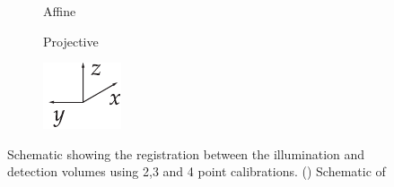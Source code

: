 \begin{figure}
\begin{subfigure}[t]{0.2\textwidth}
        \caption{Affine}\label{fig:geometry/affine}
    \end{subfigure}\hfill
    \begin{subfigure}[t]{0.2\textwidth}
        \centering
        \caption{Projective}\label{fig:geometry/projective}
    \end{subfigure}
    \begin{subfigure}[t]{0.1\textwidth}
        \centering
        \includegraphics{geometry/coordinates}
    \end{subfigure}
    \caption[Schematic showing the registration between the illumination and detection volumes using 2,3 and 4 point calibrations]{
    Schematic showing the registration between the illumination and detection volumes using 2,3 and 4 point calibrations.
    () Schematic of %
}
\end{figure}
